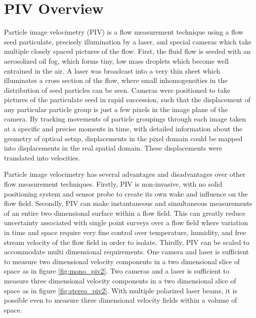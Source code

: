 
\section{PIV Overview}

Particle image velocimetry (PIV) is a flow measurement technique using a flow 
seed particulate, precisely illumination by a laser, and special cameras which 
take multiple closely spaced pictures of the flow. First, the fluid flow is 
seeded with an aerosolized oil fog, which forms tiny, low mass droplets which 
become well entrained in the air. A laser was broadcast into a very thin sheet 
which illuminates a cross section of the flow, where small inhomogeneities in 
the distribution of seed particles can be seen. Cameras were positioned to take 
pictures of the particulate seed in rapid succession, such that the 
displacement of any particular particle group is just a few pixels in the image 
plane of the camera. By tracking movements of particle groupings through each 
image taken at a specific and precise moments in time, with detailed 
information about the geometry of optical setup, displacements in the pixel 
domain could be mapped into displacements in the real spatial domain. These 
displacements were translated into velocities.

Particle image velocimetry has several advantages and disadvantages over other 
flow measurement techniques. Firstly, PIV is non-invasive, with no solid 
positioning system and sensor probe to create its own wake and influence on the 
flow field. Secondly, PIV can make instantaneous and simultaneous measurements 
of an entire two dimensional surface within a flow field. This can greatly 
reduce uncertainty associated with single point surveys over a flow field where 
variation in time and space require very fine control over temperature, 
humidity, and free stream velocity of the flow field in order to isolate. 
Thirdly, PIV can be scaled to accommodate multi dimensional requirements. One 
camera and laser is sufficient to measure two dimensional velocity 
components in a two dimensional slice of space as in figure 
\ref{fig:mono_piv2}. 
Two cameras and a laser is sufficient to measure three dimensional velocity
components in a two dimensional slice of space as in figure
\ref{fig:stereo_piv2}. With multiple polarized laser beams, it is possible even
to measure three dimensional velocity fields within a volume of space. 


